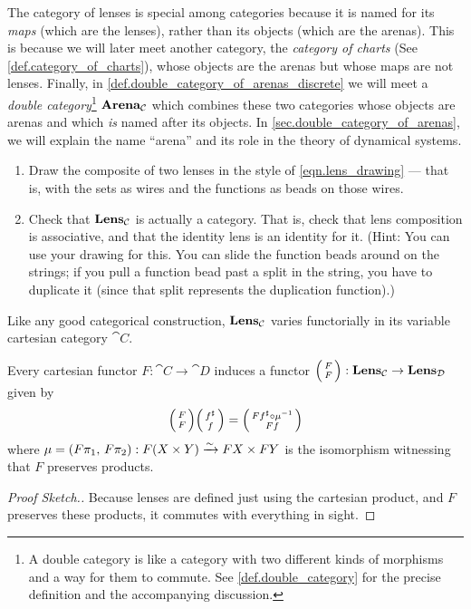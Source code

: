 \documentclass[DynamicalBook]{subfiles}
\begin{document}
\begin{remark}
  The category of lenses is special among categories because it is named for its
  \emph{maps} (which are the lenses), rather than its objects (which are the
  arenas). This is because we will later meet another category, the
  \emph{category of charts} (See \cref{def.category_of_charts}), whose objects are
  the arenas but whose maps are not lenses. Finally, in
  \cref{def.double_category_of_arenas_discrete} we will meet a \emph{double
    category}\footnote{A double category is like a category with two different
    kinds of morphisms and a way for them to commute. See
    \cref{def.double_category} for the precise definition and the accompanying
    discussion.} $\textbf{Arena}_{\mathcal{C}}$ which combines these two categories whose objects
  are arenas and which \emph{is} named after its objects. In
  \cref{sec.double_category_of_arenas}, we will explain the name ``arena'' and
  its role in the theory of dynamical systems.
\end{remark}

\begin{exercise}
  \begin{enumerate}
  	\item Draw the composite of two lenses in the style of \eqref{eqn.lens_drawing} --- that is, with the sets as wires and the functions as beads on those wires.
   	\item Check that $\textbf{Lens}_{\mathcal{C}}$ is actually a category. That is, check that
    lens composition is associative, and that the identity lens is an identity
    for it. (Hint: You can use your drawing for this. You can slide the function
    beads around on the strings; if you pull a function bead past a split in the
    string, you have to duplicate it (since that split represents the
    duplication function).)
  \qedhere
  \end{enumerate}
\end{exercise}

Like any good categorical construction, $\textbf{Lens}_{\mathcal{C}}$ varies
functorially in its variable cartesian category $\cat{C}$.
\begin{proposition}\label{prop.lens_functoriality}
  Every cartesian functor $F : \cat{C} \to \cat{D}$ induces a functor
  $\lens{F}{F} : \Cat{Lens}_{\cat{C}} \to \Cat{Lens}_{\cat{D}}$ given by
  $$\lens{F}{F}\lens{f^{\sharp}}{f} = \lens{Ff^{\sharp} \circ \mu\inv}{Ff}$$
  where $\mu = (F\pi_1,\, F\pi_2) : F(X \times Y) \xrightarrow{\sim} FX \times FY$ is
  the isomorphism witnessing that $F$ preserves products.
\end{proposition}
\begin{proof}[Proof Sketch.]
  Because lenses are defined just using the cartesian product, and $F$ preserves
  these products, it commutes with everything in sight.
\end{proof}
\end{document}
